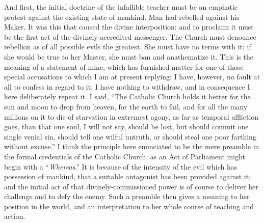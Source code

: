 And first, the initial doctrine of the infallible teacher must be an
emphatic protest against the existing state of mankind. Man had rebelled
against his Maker. It was this that caused the divine interposition: and
to proclaim it must be the first act of the divinely-accredited messenger. The Church must denounce
rebellion as of all possible evils the greatest. She must have no terms
with it; if she would be true to her Master, she must ban and
anathematize it. This is the meaning of a statement of mine,
which has furnished matter for one of those special accusations to which
I am at present replying: I have, however, no fault at all to confess in
regard to it; I have nothing to withdraw, and in consequence I here
deliberately repeat it. I said, ``The Catholic Church holds it
better for the sun and moon to drop from heaven, for the earth to fail,
and for all the many millions on it to die of starvation in extremest
agony, as far as temporal affliction goes, than that one soul, I will
not say, should be lost, but should commit one single venial sin, should
tell one wilful untruth, or should steal one poor farthing without
excuse.'' I think the principle here enunciated to be the mere
preamble in the formal credentials of the Catholic Church, as an Act of
Parliament might begin with a ``\emph{Whereas}.'' It is because
of the intensity of the evil which has possession of mankind, that a
suitable antagonist has been provided against it; and the initial act of
that divinely-commissioned power is of course to deliver her challenge
and to defy the enemy. Such a preamble then gives a meaning to her
position in the world, and an interpretation to her whole course of
teaching and action.

